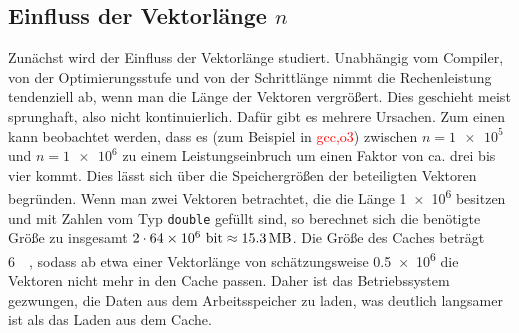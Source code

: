 \subsection{Einfluss der Vektorlänge $n$}
Zunächst wird der Einfluss der Vektorlänge studiert. Unabhängig vom Compiler, von
der Optimierungsstufe und von der Schrittlänge nimmt die Rechenleistung tendenziell
ab, wenn man die Länge der Vektoren vergrößert. Dies geschieht meist sprunghaft,
also nicht kontinuierlich. Dafür gibt es mehrere Ursachen. Zum einen kann beobachtet
werden, dass es (zum Beispiel in \textcolor{red}{gcc,o3}) zwischen $n=\num{1e5}$ und
$n=\num{1e6}$ zu einem Leistungseinbruch um einen Faktor von ca. drei bis vier kommt.
Dies lässt sich über die Speichergrößen der beteiligten Vektoren begründen. Wenn 
man zwei Vektoren betrachtet, die die Länge \num{1e6} besitzen und mit Zahlen vom Typ
\texttt{double} gefüllt sind, so berechnet sich die benötigte Größe zu insgesamt
$2\cdot \num{64e6}\mbox{~bit}\approx \SI{15.3}{\mega\byte}$. Die Größe des Caches 
beträgt \SI{6}{\mega\byte}, sodass ab etwa einer Vektorlänge von schätzungsweise \num{0.5e6}     die 
Vektoren nicht mehr in den Cache passen. Daher ist das Betriebssystem gezwungen,
die Daten aus dem Arbeitsspeicher zu laden, was deutlich langsamer ist als das Laden
aus dem Cache.

% 
% 
% 
% 
% 
% 
% 
% 
% 
% 
% 
% 
% 
